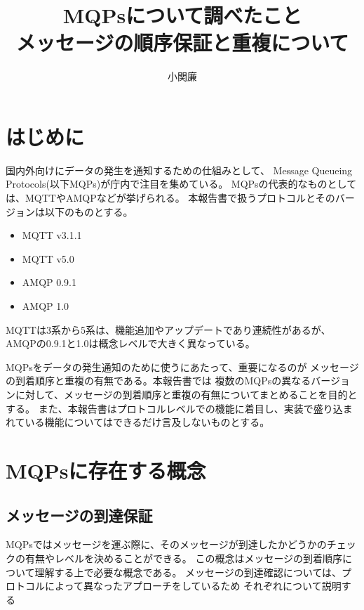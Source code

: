 \documentclass[uplatex, twocolumn,10pt]{jsarticle}
\begin{document}
\title{\bf{\LARGE{MQPsについて調べたこと} \\ \Large{メッセージの順序保証と重複について}}}
\author{小関廉}
\date{}
\maketitle

\section{はじめに}

国内外向けにデータの発生を通知するための仕組みとして、
Message Queueing Protocols(以下MQPs)が庁内で注目を集めている。
MQPsの代表的なものとしては、MQTTやAMQPなどが挙げられる。
本報告書で扱うプロトコルとそのバージョンは以下のものとする。



\begin{itemize}
    \item MQTT v3.1.1 \cite{MQTTVers22:online}
    \item MQTT v5.0 \cite{MQTTVers5:online}
    \item AMQP 0.9.1 \cite{AMQPWork14:online}
    \item AMQP 1.0 \cite{amqpcore25:online}
\end{itemize}

MQTTは3系から5系は、機能追加やアップデートであり連続性があるが、
AMQPの0.9.1と1.0は概念レベルで大きく異なっている。

MQPsをデータの発生通知のために使うにあたって、重要になるのが
メッセージの到着順序と重複の有無である。本報告書では
複数のMQPsの異なるバージョンに対して、メッセージの到着順序と重複の有無についてまとめることを目的とする。
また、本報告書はプロトコルレベルでの機能に着目し、実装で盛り込まれている機能についてはできるだけ言及しないものとする。

\section{MQPsに存在する概念}

\subsection{メッセージの到達保証}
\label{section:qos}

MQPsではメッセージを運ぶ際に、そのメッセージが到達したかどうかのチェックの有無やレベルを決めることができる。
この概念はメッセージの到着順序について理解する上で必要な概念である。
メッセージの到達確認については、プロトコルによって異なったアプローチをしているため
それぞれについて説明する
\end{document}
